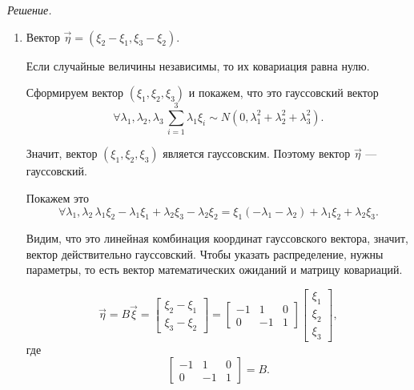 \textit{Решение.}
\begin{enumerate}[label=\alph*)]
  \item Вектор $ \vec{ \eta } = \left( \xi_2 - \xi_1, \xi_3 - \xi_2 \right) $.

  Если случайные величины независимы, то их ковариация равна нулю.

  Сформируем вектор $ \left( \xi_1, \xi_2, \xi_3 \right) $ и покажем, что это гауссовский вектор
  $$ \forall \lambda_1, \lambda_2, \lambda_3 \,
    \sum \limits_{i = 1}^3 \lambda_1 \xi_i \sim
    N \left( 0, \lambda_1^2 + \lambda_2^2 + \lambda_3^2 \right).$$

  Значит, вектор $ \left( \xi_1, \xi_2, \xi_3 \right) $ является гауссовским.
  Поэтому вектор $ \vec{ \eta } $ --- гауссовский.

  Покажем это
  $$ \forall \lambda_1, \lambda_2 \,
    \lambda_1 \xi_2 - \lambda_1 \xi_1 + \lambda_2 \xi_3 - \lambda_2 \xi_2 =
    \xi_1 \left( - \lambda_1 - \lambda_2 \right) + \lambda_1 \xi_2 + \lambda_2 \xi_3.$$

  Видим, что это линейная комбинация координат гауссовского вектора, значит,
  вектор действительно гауссовский.
  Чтобы указать распределение, нужны параметры,
  то есть вектор математических ожиданий и матрицу ковариаций.

  $$ \vec{ \eta } =
    B \vec{ \xi } =
    \begin{bmatrix}
      \xi_2 - \xi_1 \\
      \xi_3 - \xi_2
    \end{bmatrix} =
    \begin{bmatrix}
      -1 & 1 & 0 \\
      0 & -1 & 1
    \end{bmatrix}
    \begin{bmatrix}
      \xi_1 \\
      \xi_2 \\
      \xi_3
    \end{bmatrix},$$
  где
  $$ \begin{bmatrix}
      -1 & 1 & 0 \\
      0 & -1 & 1
    \end{bmatrix} =
    B.$$


\end{enumerate}
